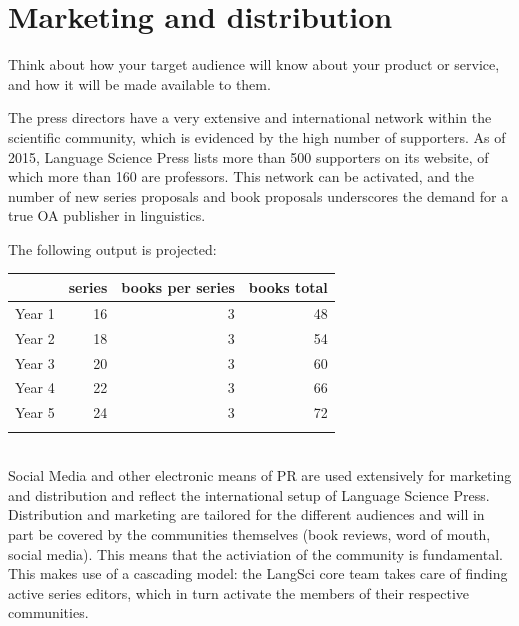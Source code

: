 \documentclass[nonflat,smallfont
]{langsci/langscibook}
\newcommand{\background}[1]{ 
  \vspace{5mm}
  \renewcommand{\tblslinecolour}{lsDarkBlue}
  \tblssy[red]{explore2}{Background}{\vspace*{-5mm}#1}
}
\newcommand{\langscisolution}[1]{
  \renewcommand{\tblslinecolour}{lsLightBlue}
  \tblssy{langsci}{LangSci solution}{\vspace*{-5mm}#1}
}
\renewcommand{\tblssy}[4][black!12]{%
  \renewcommand{\langscisymbol}{#2}\renewcommand{\tblsboxcolor}{#1}
  \begin{mdframed}[style=yellowexercise,frametitle={#3}]
    #4
  \end{mdframed}
}
\begin{document}
\section{Marketing and distribution}
\vspace*{5mm}
\background{
Think about how your target audience will know about your product or service, and how it will be made available to them. 
}
\langscisolution{
The press directors have a very extensive and international network within the scientific community, which is evidenced by the high number of supporters. As of 2015, Language Science Press lists more than 500 supporters on its website, of which more than 160 are professors. This network can be activated, and the number of new series proposals and book proposals underscores the demand for a true OA publisher in linguistics. 

The following output is projected:\\

\noindent
\begin{tabularx}{\textwidth}{Xrrr}
\lsptoprule
        & series &  books per series & books total   \\
\midrule         
Year 1 & 16      &  3                & 48              \\
Year 2 & 18      &  3                & 54              \\
Year 3 & 20      &  3                & 60              \\
Year 4 & 22      &  3                & 66              \\
Year 5 & 24      &  3                & 72              \\
\lspbottomrule
\end{tabularx}\\

Social Media and other electronic means of PR are used extensively for marketing and distribution and reflect the international setup of Language Science Press. Distribution and marketing are tailored for the different audiences and will in part be covered by the communities themselves (book reviews, word of mouth, social media). This means that the activiation of the community is fundamental. This makes use of a cascading model: the LangSci core team takes care of finding active series editors, which in turn activate the members of their respective communities.  
}
\end{document}
